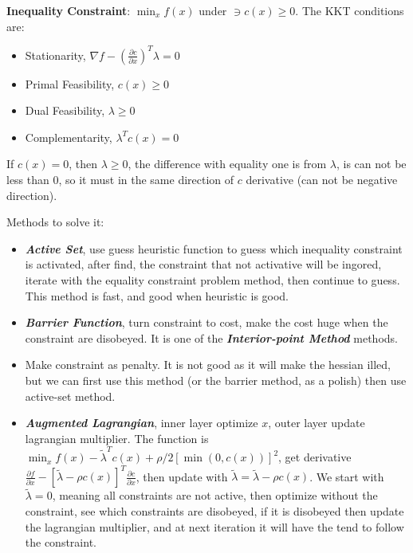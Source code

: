 \documentclass[10pt]{elegantbook}
\newcommand{\mydefination}[1]{\textbf{\textit{\textcolor{structurecolor}{#1}}}}
\begin{document}
\textbf{Inequality Constraint}: $\min_x f(x)$ under $\ni c(x) \geq 0$. The KKT conditions are:
\begin{itemize}
    \item Stationarity, $\nabla f - (\frac{\partial c}{\partial x})^T \lambda = 0 $
    \item Primal Feasibility, $c(x) \geq 0$
    \item Dual Feasibility, $\lambda \geq 0$
    \item Complementarity, $\lambda^T c(x) = 0$
\end{itemize}
If $c(x) = 0$, then $\lambda \geq 0$, the difference with equality one is from $\lambda$, is can not be less than 0, so
it must in the same direction of $c$ derivative (can not be negative direction).

Methods to solve it:
\begin{itemize}
    \item \mydefination{Active Set}, use guess heuristic function to guess which inequality constraint is activated,
after find, the constraint that not activative will be ingored, iterate with the equality constraint problem method,
then continue to guess. This method is fast, and good when heuristic is good.
    \item \mydefination{Barrier Function}, turn constraint to cost, make the cost huge when the constraint are disobeyed.
It is one of the \mydefination{Interior-point Method} methods.
    \item Make constraint as penalty. It is not good as it will make the hessian illed, but we can first use this method
(or the barrier method, as a polish) then use active-set method.
    \item \mydefination{Augmented Lagrangian}, inner layer optimize $x$, outer layer update lagrangian multiplier. The
function is $\min_x f(x) - \tilde{\lambda}^T c(x) + \rho / 2 [\min(0, c(x))]^2$, get derivative 
$\frac{\partial f}{\partial x}- [\tilde{\lambda} - \rho c(x)]^T \frac{\partial c}{\partial x}$, then update with 
$\tilde{\lambda} = \tilde{\lambda} - \rho c(x)$.
We start with $\tilde{\lambda}=0$, meaning all constraints are not active, then optimize without the constraint, see which
constraints are disobeyed, if it is disobeyed then update the lagrangian multiplier, and at next iteration it will have the
tend to follow the constraint.
\end{itemize}
\end{document}
